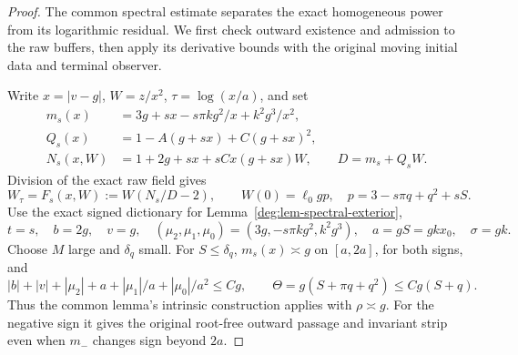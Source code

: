 \begin{proof}
The common spectral estimate separates the exact homogeneous power
from its logarithmic residual. We first check outward existence and
admission to the raw buffers, then apply its derivative bounds with
the original moving initial data and terminal observer.

Write \(x=|v-g|\), \(W=z/x^2\), \(\tau=\log(x/a)\), and set
\begin{align*}
 m_s(x)&=3g+sx-s\pi kg^2/x+k^2g^3/x^2,\\
 Q_s(x)&=1-A(g+sx)+C(g+sx)^2,\\
 N_s(x,W)&=1+2g+sx+sCx(g+sx)W,
 \qquad D=m_s+Q_sW .
\end{align*}
Division of the exact raw field gives
\begin{equation}\label{deg:quadratic-outer-ratio}
 W_\tau=F_s(x,W):=W(N_s/D-2),\qquad
 W(0)=\ell_0gp,\quad p=3-s\pi q+q^2+sS.
\end{equation}
Use the exact signed dictionary for Lemma~\ref{deg:lem-spectral-exterior},
\[
 t=s,\quad b=2g,\quad v=g,\quad
 (\mu_2,\mu_1,\mu_0)=(3g,-s\pi kg^2,k^2g^3),\quad
 a=gS=gkx_0,\quad\sigma=gk.
\]
Choose \(M\) large and \(\delta_q\) small. For \(S\le\delta_q\),
\(m_s(x)\asymp g\) on \([a,2a]\), for both signs, and
\[
 |b|+|v|+|\mu_2|+a+|\mu_1|/a+|\mu_0|/a^2\le Cg,
 \qquad \Theta=g(S+\pi q+q^2)\le Cg(S+q).
\]
Thus the common lemma's intrinsic construction applies with
\(\rho\asymp g\). For the negative sign it gives the original
root-free outward passage and invariant strip even when \(m_-\)
changes sign beyond \(2a\).


\end{proof}
